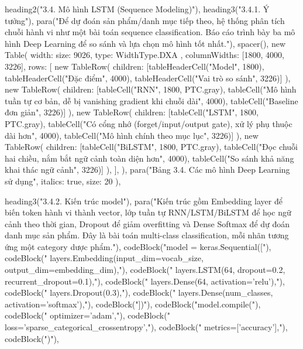   heading2("3.4. Mô hình LSTM (Sequence Modeling)"),
  heading3("3.4.1. Ý tưởng"),
  para("Để dự đoán sản phẩm/danh mục tiếp theo, hệ thống phân tích chuỗi hành vi như một bài toán sequence classification. Báo cáo trình bày ba mô hình Deep Learning để so sánh và lựa chọn mô hình tốt nhất."),
  spacer(),
  new Table({
    width: { size: 9026, type: WidthType.DXA },
    columnWidths: [1800, 4000, 3226],
    rows: [
      new TableRow({ children: [tableHeaderCell("Model", 1800), tableHeaderCell("Đặc điểm", 4000), tableHeaderCell("Vai trò so sánh", 3226)] }),
      new TableRow({ children: [tableCell("RNN", 1800, PTC.gray), tableCell("Mô hình tuần tự cơ bản, dễ bị vanishing gradient khi chuỗi dài", 4000), tableCell("Baseline đơn giản", 3226)] }),
      new TableRow({ children: [tableCell("LSTM", 1800, PTC.gray), tableCell("Có cổng nhớ (forget/input/output gate), xử lý phụ thuộc dài hơn", 4000), tableCell("Mô hình chính theo mục lục", 3226)] }),
      new TableRow({ children: [tableCell("BiLSTM", 1800, PTC.gray), tableCell("Đọc chuỗi hai chiều, nắm bắt ngữ cảnh toàn diện hơn", 4000), tableCell("So sánh khả năng khai thác ngữ cảnh", 3226)] }),
    ],
  }),
  para("Bảng 3.4. Các mô hình Deep Learning sử dụng", { italics: true, size: 20 }),

  heading3("3.4.2. Kiến trúc model"),
  para("Kiến trúc gồm Embedding layer để biến token hành vi thành vector, lớp tuần tự RNN/LSTM/BiLSTM để học ngữ cảnh theo thời gian, Dropout để giảm overfitting và Dense Softmax để dự đoán danh mục sản phẩm. Đây là bài toán multi-class classification, mỗi nhãn tương ứng một category dược phẩm."),
  codeBlock("model = keras.Sequential(["),
  codeBlock("    layers.Embedding(input_dim=vocab_size, output_dim=embedding_dim),"),
  codeBlock("    layers.LSTM(64, dropout=0.2, recurrent_dropout=0.1),"),
  codeBlock("    layers.Dense(64, activation='relu'),"),
  codeBlock("    layers.Dropout(0.3),"),
  codeBlock("    layers.Dense(num_classes, activation='softmax'),"),
  codeBlock("])"),
  codeBlock("model.compile("),
  codeBlock("    optimizer='adam',"),
  codeBlock("    loss='sparse_categorical_crossentropy',"),
  codeBlock("    metrics=['accuracy'],"),
  codeBlock(")"),

